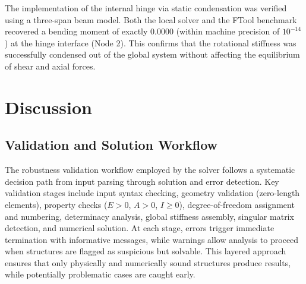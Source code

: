 \begin{table}[h!]
\centering
\caption{Structure Sample (e): FTool and solver comparison}
\label{tab:sample_e_comparison}
\small
\setlength{\tabcolsep}{5pt}
\renewcommand{\arraystretch}{1.12}
\end{table}

The implementation of the internal hinge via static condensation was verified using a three-span beam model. Both the local solver and the FTool benchmark recovered a bending moment of exactly $0.0000$ (within machine precision of $10^{-14}$) at the hinge interface (Node 2). This confirms that the rotational stiffness was successfully condensed out of the global system without affecting the equilibrium of shear and axial forces.

\clearpage

\section{Discussion}

\subsection*{Validation and Solution Workflow}

The robustness validation workflow employed by the solver follows a systematic decision path from input parsing through solution and error detection. Key validation stages include input syntax checking, geometry validation (zero-length elements), property checks ($E > 0$, $A > 0$, $I \geq 0$), degree-of-freedom assignment and numbering, determinacy analysis, global stiffness assembly, singular matrix detection, and numerical solution. At each stage, errors trigger immediate termination with informative messages, while warnings allow analysis to proceed when structures are flagged as suspicious but solvable. This layered approach ensures that only physically and numerically sound structures produce results, while potentially problematic cases are caught early.

